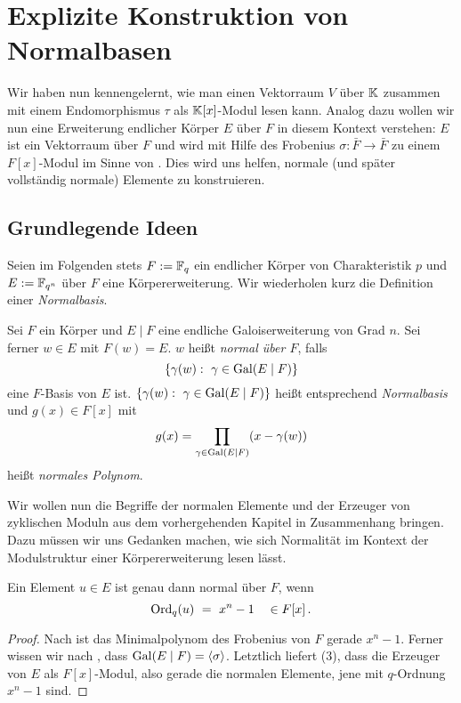 \chapter{Explizite Konstruktion von Normalbasen}

Wir haben nun kennengelernt, wie man einen 
Vektorraum $V$ über $\mathbb{K}$ zusammen mit einem Endomorphismus $\tau$ als
$\mathbb{K}[x]$-Modul lesen kann. Analog dazu wollen wir nun eine Erweiterung
endlicher Körper $E$ über $F$ in diesem Kontext verstehen: $E$ ist ein
Vektorraum über $F$ und wird mit Hilfe des Frobenius 
$\sigma: \bar F \to \bar F$ zu einem $F[x]$-Modul im Sinne von 
. Dies wird uns helfen, normale (und später vollständig
normale) Elemente zu konstruieren.

\section{Grundlegende Ideen}

Seien im Folgenden stets $F := \mathbb{F}_q$ ein endlicher Körper von 
Charakteristik $p$ und $E := \mathbb{F}_{q^n}$ über $F$ eine Körpererweiterung.
Wir wiederholen kurz die Definition einer \emph{Normalbasis}.

\begin{definition}
  \label{def:normal}
  Sei $F$ ein Körper und $E \mid F$ eine endliche Galoiserweiterung von Grad
  $n$. Sei ferner $w\in E$ mit $F(w) = E$. $w$ heißt \emph{normal über $F$},
  falls
  \[ \{ \gamma(w):\ \gamma \in \operatorname{Gal}(E\mid F) \}\]
  eine $F$-Basis von $E$ ist. 
  $\{ \gamma(w):\ \gamma \in \operatorname{Gal}(E\mid F)\}$ heißt entsprechend 
  \emph{Normalbasis} und $g(x) \in F[x]$ mit 
  \[ g(x) = \prod_{\gamma \in \operatorname{Gal}(E\mid F)}(x - \gamma(w))\]
  heißt \emph{normales Polynom}.
\end{definition}

Wir wollen nun die Begriffe der normalen Elemente und der Erzeuger von
zyklischen Moduln aus dem vorhergehenden Kapitel in Zusammenhang bringen. Dazu
müssen wir uns Gedanken machen, wie sich Normalität im Kontext der
Modulstruktur einer Körpererweiterung lesen lässt.

\begin{satz}
  Ein Element $u\in E$ ist genau dann normal über $F$, wenn
  \[ \operatorname{Ord}_q(u) \ =\  x^n-1 \quad\in F[x]\,.\]
\end{satz}
\begin{proof}
  Nach  ist das Minimalpolynom des Frobenius von $F$
  gerade $x^n-1$. Ferner wissen wir nach ,
  dass $\operatorname{Gal}(E\mid F) = \langle\sigma\rangle$. 
  Letztlich liefert  (3), dass die Erzeuger von 
  $E$ als $F[x]$-Modul, also gerade die normalen Elemente, jene mit $q$-Ordnung
  $x^n-1$ sind.
\end{proof}

